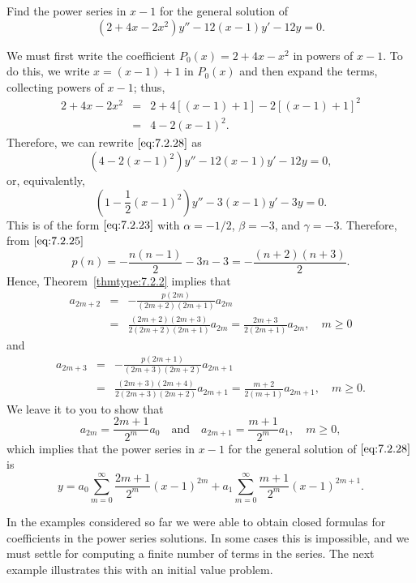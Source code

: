 \documentclass{ximera}
\begin{document}
\begin{example}\label{example:7.2.3}
Find the power series in $x-1$  for the general
solution of
\begin{equation}\label{eq:7.2.28}
(2+4x-2x^2)y''-12(x-1)y'-12y=0.
\end{equation}
\begin{explanation}
We must first write the coefficient $P_0(x)=2+4x-x^2$ in powers of
$x-1$. To do this,
 we write $x=(x-1)+1$ in $P_0(x)$ and then expand
the terms, collecting powers of $x-1$;   thus,
\begin{eqnarray*}
2+4x-2x^2&=&2+4[(x-1)+1]-2[(x-1)+1]^2\\
&=&4-2(x-1)^2.
\end{eqnarray*}
Therefore, we can rewrite $\eqref{eq:7.2.28}$ as
$$
\left(4-2(x-1)^2\right)y''-12(x-1)y'-12y=0,
$$
or, equivalently,
$$
\left(1-\frac{1}{2}(x-1)^2\right)y''-3(x-1)y'-3y=0.
$$
This is of the form $\eqref{eq:7.2.23}$ with  $\alpha=-1/2$, $\beta=-3$, and
$\gamma=-3$. Therefore, from $\eqref{eq:7.2.25}$
$$
p(n)=-\frac{n(n-1)}{2}-3n-3=-\frac{(n+2)(n+3)}{2}.
$$
Hence, Theorem~\ref{thmtype:7.2.2} implies that
\begin{eqnarray*}
a_{2m+2}&=&-\frac{p(2m)}{(2m+2)(2m+1)}a_{2m}\\&=&
\frac{(2m+2)(2m+3)}{2(2m+2)(2m+1)}
a_{2m}=\frac{2m+3}{2(2m+1)}a_{2m},\quad m\geq0
\end{eqnarray*}
and
\begin{eqnarray*}
a_{2m+3}&=&-\frac{p(2m+1)}{(2m+3)(2m+2)}a_{2m+1}\\&=&
\frac{(2m+3)(2m+4)}{2
(2m+3)(2m+2)}a_{2m+1}=\frac{m+2}{2(m+1)}a_{2m+1},\quad m\geq0.
\end{eqnarray*}
We leave it to you to show that
$$
a_{2m}=\frac{2m+1}{2^m}a_0\quad\mbox{and}\quad
a_{2m+1}=\frac{m+1}{2^m}a_1,\quad m\geq0,
$$
which implies that the power series in $x-1$ for the general solution of $\eqref{eq:7.2.28}$ is
$$
y=a_0\sum_{m=0}^\infty\frac{2m+1}{2^m}(x-1)^{2m}+a_1\sum_{m=0}^\infty
\frac{m+1}{2^m}(x-1)^{2m+1}.
$$
\end{explanation}
\end{example}

In the examples considered so far we were able to obtain closed
formulas for coefficients in the power series solutions. In some cases
this is impossible, and we must settle for computing a finite number
of terms in the series. The next example illustrates this with an
initial value problem.
\end{document}
